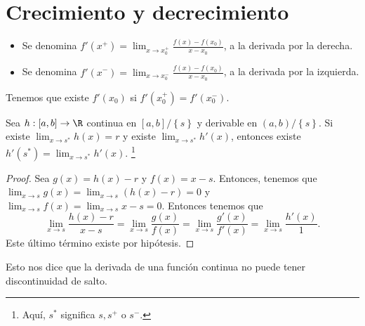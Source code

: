 \section{Crecimiento y decrecimiento}
\begin{notation}
\normalfont 
\begin{itemize}
\item Se denomina $\displaystyle f'\left(x^{+}\right) = \lim_{x \to x_{0}^{+}}\frac{f\left(x\right)-f\left(x_{0}\right)}{x - x_{0}} $, a la derivada por la derecha.
\item Se denomina $\displaystyle f'\left(x^{-}\right) = \lim_{x \to x_{0}^{-}}\frac{f\left(x\right)-f\left(x_{0}\right)}{x-x_{0}} $, a la derivada por la izquierda.
\end{itemize}
\end{notation}
\begin{observation}
\normalfont Tenemos que existe $\displaystyle f'\left(x_{0}\right) $ si $\displaystyle f'\left(x_{0}^{+}\right) = f'\left(x_{0}^{-}\right) $.
\end{observation}
\begin{fcolorary}[]
	\normalfont Sea $\displaystyle h: \left[a,b\right] \to \R $ continua en $\displaystyle \left[a,b\right] / \left\{ s\right\}  $ y derivable en $\displaystyle \left(a,b\right) / \left\{ s\right\}  $. Si existe $\displaystyle \lim_{x \to s^{*}}h\left(x\right) = r $ y existe $\displaystyle \lim_{x \to s^{*}}h'\left(x\right) $, entonces existe $\displaystyle h'\left(s^{*}\right) = \lim_{x \to s^{*}}h'\left(x\right) $. \footnote{Aquí, $\displaystyle s^{*} $ significa $\displaystyle s, s^{+} $ o $\displaystyle s^{-} $.} 
\end{fcolorary}
\begin{proof}
Sea $\displaystyle g\left(x\right) = h\left(x\right)-r $ y $\displaystyle f\left(x\right) = x - s $. Entonces, tenemos que $\displaystyle \lim_{x \to s}g\left(x\right) = \lim_{x \to s}\left(h\left(x\right)-r\right) = 0 $ y $\displaystyle \lim_{x \to s}f\left(x\right) = \lim_{x \to s}x-s = 0 $. Entonces tenemos que
\[\lim_{x \to s}\frac{h\left(x\right)-r}{x-s}=\lim_{x \to s}\frac{g\left(x\right)}{f\left(x\right)} = \lim_{x \to s}\frac{g'\left(x\right)}{f'\left(x\right)} = \lim_{x \to s}\frac{h'\left(x\right)}{1} .\]
Este último término existe por hipótesis.
\end{proof}
\begin{observation}
\normalfont Esto nos dice que la derivada de una función continua no puede tener discontinuidad de salto.
\end{observation}
